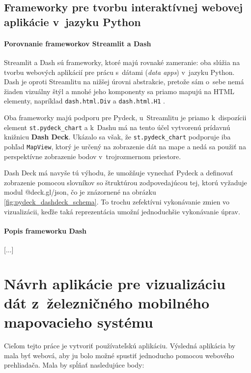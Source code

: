 \section{Frameworky pre tvorbu interaktívnej webovej aplikácie v~jazyku Python}

\subsubsection{Porovnanie frameworkov Streamlit a Dash}

Streamlit a Dash sú frameworky, ktoré majú rovnaké zameranie: oba slúžia na tvorbu webových aplikácií pre prácu s~dátami (\emph{data apps}) v~jazyku Python. Dash je oproti Streamlitu na nižšej úrovni abstrakcie, pretože sám o~sebe nemá žiaden vizuálny štýl a mnohé jeho komponenty sa priamo mapujú na HTML elementy, napríklad \texttt{dash.html.Div} a \texttt{dash.html.H1} \cite{streamlit_documentation}\cite{dash_documentation}.

Oba frameworky majú podporu pre Pydeck, u~Streamlitu je priamo k~dispozícii element \texttt{st.pydeck\_chart} a k~Dashu má na tento účel vytvorenú prídavnú knižnicu \textbf{Dash Deck}. Ukázalo sa však, že \texttt{st.pydeck\_chart} podporuje iba pohľad \texttt{MapView}, ktorý je určený na zobrazenie dát na mape a nedá sa použiť na perspektívne zobrazenie bodov v~trojrozmernom priestore.

Dash Deck má navyše tú výhodu, že umožňuje vynechať Pydeck a definovať zobrazenie pomocou slovníkov so štruktúrou zodpovedajúcou tej, ktorú vyžaduje modul @deck.gl/json, čo je znázornené na obrázku \ref{fig:pydeck_dashdeck_schema}. To trochu zefektívni vykonávanie zmien vo vizualizácii, keďže taká reprezentácia umožní jednoduchšie vykonávanie úprav.

\subsubsection{Popis frameworku Dash}

[...]

\chapter{Návrh aplikácie pre vizualizáciu dát z~železničného mobilného mapovacieho systému}

Cieľom tejto práce je vytvoriť používateľskú aplikáciu. Výsledná aplikácia by mala byť webová, aby ju bolo možné spustiť jednoducho pomocou webového prehliadača. Mala by spĺňať nasledujúce body:

